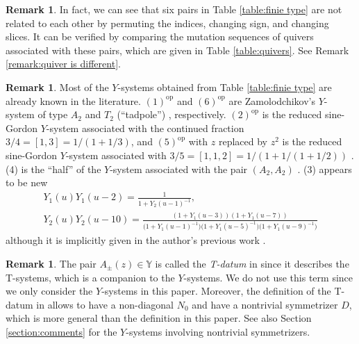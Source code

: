 \documentclass[pdftex]{sigma}
\numberwithin{equation}{section}
\theoremstyle{definition}
\newtheorem{Remark}[Theorem]{Remark}
\begin{document}
\begin{Remark}
 In fact, we can see that six pairs in Table \ref{table:finie type} are not related to each other
 by permuting the indices, changing sign, and changing slices.
 It can be verified by comparing the mutation sequences of quivers associated with these pairs,
 which are given in Table \ref{table:quivers}.
 See Remark \ref{remark:quiver is different}.
\end{Remark}

\begin{Remark}
 Most of the $Y$-systems obtained from Table \ref{table:finie type} are
 already known in the literature. $\mathrm{(1)}^{\mathrm{op}}$ and $\mathrm{(6)}^{\mathrm{op}}$
 are Zamolodchikov's $Y$-system of type $A_2$ \cite{Zamo} and $T_2$ (``tadpole'') \cite{RVT}, respectively.
 $\mathrm{(2)}^{\mathrm{op}}$ is the reduced sine-Gordon $Y$-system associated with the continued fraction~${3/4 = [1,3] = 1/(1+1/3)}$,
 and $\mathrm{(5)}^{\mathrm{op}}$ with $z$ replaced by $z^2$ is the reduced sine-Gordon $Y$-system associated with $3/5 = [1,1,2] = 1/(1+1/(1+1/2))$ \cite{Tateo} .
 (4) is the ``half'' of the $Y$-system associated with the pair $(A_2, A_2)$ \cite{RVT}.
 (3) appears to be new
 \begin{gather*}
 Y_1 (u) Y_1 (u - 2) = \frac{1}{1 + Y_2(u-1)^{-1}}, \\
 Y_2 (u) Y_2 (u - 10) =
 \frac{(1 + Y_1(u-3))(1 + Y_1(u-7))}
 {\bigl(1 + Y_1(u-1)^{-1}\bigr)\bigl(1 + Y_1(u-5)^{-1}\bigr)\bigl(1 + Y_1(u-9)^{-1}\bigr)}
 \end{gather*}
 although it is implicitly given in the author's previous work \cite[Table 2]{mizuno2020difference}.
\end{Remark}

\begin{Remark}
 The pair $A_\pm (z) \in \mathbb{Y}$ is called the \emph{T-datum} in \cite{mizuno2020difference} since
 it describes the T-systems, which is a companion to the $Y$-systems. We do not use this term since
 we only consider the $Y$-systems in this paper.
 Moreover, the definition of the T-datum in \cite{mizuno2020difference} allows to have a non-diagonal $N_0$ and
 have a nontrivial symmetrizer $D$, which is more general than the definition in this paper.
 See also Section \ref{section:comments} for the $Y$-systems involving nontrivial symmetrizers.
\end{Remark}
\end{document}
